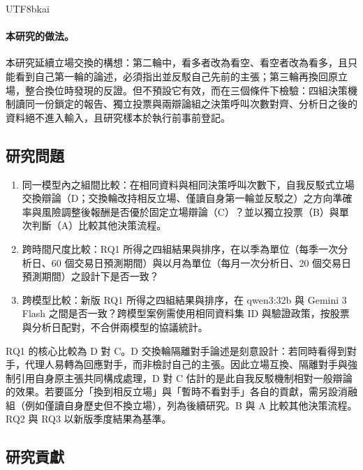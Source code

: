 \documentclass[12pt,a4paper]{article}
\newcommand{\grp}[1]{\textsf{#1}}
\begin{document}
\begin{CJK}{UTF8}{bkai}
\paragraph{本研究的做法。}
本研究延續立場交換的構想：第二輪中，看多者改為看空、看空者改為看多，且只能看到自己第一輪的論述，必須指出並反駁自己先前的主張；第三輪再換回原立場，整合換位時發現的反證。但不預設它有效，而在三個條件下檢驗：四組決策機制讀同一份鎖定的報告、獨立投票與兩辯論組之決策呼叫次數對齊、分析日之後的資料絕不進入輸入，且研究樣本於執行前事前登記。

\subsection{研究問題}

\begin{enumerate}[label=RQ\arabic*：,leftmargin=4em]
  \item 同一模型內之組間比較：在相同資料與相同決策呼叫次數下，自我反駁式立場交換辯論（\grp{D}；交換輪改持相反立場、僅讀自身第一輪並反駁之）之方向準確率與風險調整後報酬是否優於固定立場辯論（\grp{C}）？並以獨立投票（\grp{B}）與單次判斷（\grp{A}）比較其他決策流程。
  \item 跨時間尺度比較：RQ1 所得之四組結果與排序，在以季為單位（每季一次分析日、60 個交易日預測期間）與以月為單位（每月一次分析日、20 個交易日預測期間）之設計下是否一致？
  \item 跨模型比較：新版 RQ1 所得之四組結果與排序，在 qwen3:32b 與 Gemini 3 Flash 之間是否一致？跨模型案例需使用相同資料集 ID 與驗證政策，按股票與分析日配對，不合併兩模型的協議統計。
\end{enumerate}

\noindent RQ1 的核心比較為 \grp{D} 對 \grp{C}。\grp{D} 交換輪隔離對手論述是刻意設計：若同時看得到對手，代理人易轉為回應對手，而非檢討自己的主張。因此立場互換、隔離對手與強制引用自身原主張共同構成處理，\grp{D} 對 \grp{C} 估計的是此自我反駁機制相對一般辯論的效果。若要區分「換到相反立場」與「暫時不看對手」各自的貢獻，需另設消融組（例如僅讀自身歷史但不換立場），列為後續研究。\grp{B} 與 \grp{A} 比較其他決策流程。RQ2 與 RQ3 以新版季度結果為基準。

\subsection{研究貢獻}


\end{CJK}
\end{document}
